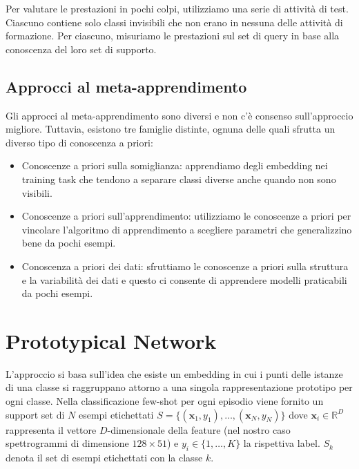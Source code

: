 \documentclass[12pt,a4paper,titlepage]{article}
\begin{document}
Per valutare le prestazioni in pochi colpi, utilizziamo una serie di attività di test. Ciascuno contiene solo classi invisibili che non erano in nessuna delle attività di formazione. Per ciascuno, misuriamo le prestazioni sul set di query in base alla conoscenza del loro set di supporto.

\subsection{Approcci al meta-apprendimento}
Gli approcci al meta-apprendimento sono diversi e non c'è consenso sull'approccio migliore. Tuttavia, esistono tre famiglie distinte, ognuna delle quali sfrutta un diverso tipo di conoscenza a priori:
\begin{itemize}
	\item Conoscenze a priori sulla somiglianza: apprendiamo degli embedding nei training task che tendono a separare classi diverse anche quando non sono visibili.
	\item Conoscenze a priori sull'apprendimento: utilizziamo le conoscenze a priori per vincolare l'algoritmo di apprendimento a scegliere parametri che generalizzino bene da pochi esempi.
	\item Conoscenza a priori dei dati: sfruttiamo le conoscenze a priori sulla struttura e la variabilità dei dati e questo ci consente di apprendere modelli praticabili da pochi esempi.
\end{itemize}

\section{Prototypical Network}
L'approccio si basa sull'idea che esiste un embedding in cui i punti delle istanze di una classe si raggruppano attorno a una singola rappresentazione prototipo per ogni classe.
Nella classificazione few-shot per ogni episodio viene fornito un support set di $N$ esempi etichettati  $S=\{(\mathbf{x}_1,y_1), \dots,(\mathbf{x}_N,y_N)\}$ dove $\mathbf{x}_i\in \mathbb{R}^D$ rappresenta il vettore $D$-dimensionale della feature (nel nostro caso spettrogrammi di dimensione $128 \times 51$) e $y_i \in \{1, \dots, K\}$ la rispettiva label. $S_k$ denota il set di esempi etichettati con la classe $k$.
\end{document}
